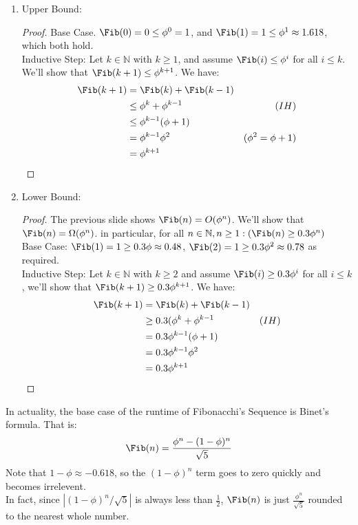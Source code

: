 \documentclass{article}
\begin{document}
\begin{enumerate}
    \item Upper Bound:
    \begin{proof}
    Base Case. $\Fib(0) = 0 \leq \phi^0 = 1$, and $\Fib(1) = 1 \leq \phi^1 \approx 1.618$, which both hold.\\
    Inductive Step: Let $k \in \mathbb{N}$ with $k \geq 1$, and assume $\Fib(i) \leq \phi^i$ for all $i \leq k$. We'll show that $\Fib(k + 1) \leq \phi^{k + 1}$. We have:
    \begin{align*}
        \Fib(k + 1) & = \Fib(k) + \Fib(k - 1)\\
        & \leq \phi^k + \phi^{k - 1} & (IH)\\
        & \leq \phi^{k - 1}(\phi + 1)\\
        & = \phi^{k - 1}\phi^2 & (\phi^2 = \phi + 1)\\
        & = \phi^{k + 1}
    \end{align*}
    \end{proof}
    \item Lower Bound:
    \begin{proof}
    The previous slide shows $\Fib(n) = O(\phi^n)$. We'll show that $\Fib(n) = \Omega(\phi^n)$. in particular, for all $n \in \mathbb{N}, n \geq 1 : (\Fib(n) \geq 0.3 \phi^n)$\\
    Base Case: $\Fib(1) = 1 \geq 0.3\phi \approx 0.48$, $\Fib(2) = 1 \geq 0.3 \phi^2 \approx 0.78$ as required.\\
    Inductive Step: Let $k \in \mathbb{N}$ with $k \geq 2$ and assume $\Fib(i) \geq 0.3\phi^i$ for all $i \leq k$, we'll show that $\Fib(k + 1) \geq 0.3\phi^{k + 1}$. We have:
    \begin{align*}
        \Fib(k + 1) & = \Fib(k) + \Fib(k - 1)\\
        & \geq 0.3(\phi^k + \phi^{k - 1} & (IH)\\
        & = 0.3\phi^{k - 1}(\phi + 1)\\
        & = 0.3\phi^{k - 1}\phi^2\\
        & = 0.3\phi^{k + 1}
    \end{align*}
    \end{proof}
\end{enumerate}
In actuality, the base case of the runtime of Fibonacchi's Sequence is Binet's formula. That is:
$$\Fib(n) = \frac{\phi^n - (1 - \phi)^n}{\sqrt{5}}$$
Note that $1 - \phi \approx -0.618$, so the $(1 - \phi)^n$ term goes to zero quickly and becomes irrelevent. \\
In fact, since $|(1 - \phi)^n/\sqrt{5}|$ is always less than $\frac{1}{2}$, $\Fib(n)$ is just $\frac{\phi^n}{\sqrt{5}}$ rounded to the nearest whole number.
\end{document}
